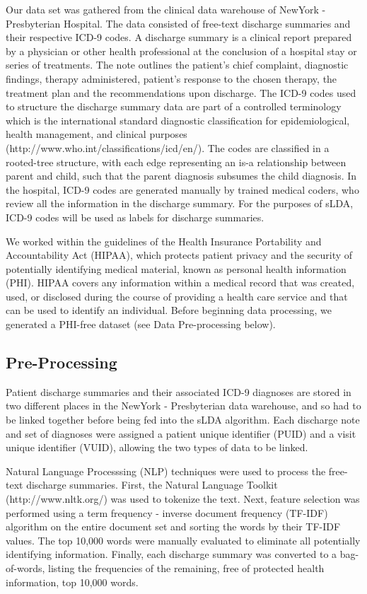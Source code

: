 \documentclass{article}
\begin{document}
Our data set was gathered from the clinical data warehouse of NewYork
- Presbyterian Hospital. The data consisted of free-text discharge
summaries and their respective ICD-9 codes. A discharge summary is
a clinical report prepared by a physician or other health professional
at the conclusion of a hospital stay or series of treatments. The
note outlines the patient\textquoteright{}s chief complaint, diagnostic
findings, therapy administered, patient\textquoteright{}s response
to the chosen therapy, the treatment plan and the recommendations
upon discharge. The ICD-9 codes used to structure the discharge summary
data are part of a controlled terminology which is the international
standard diagnostic classification for epidemiological, health management,
and clinical purposes (http://www.who.int/classifications/icd/en/).
The codes are classified in a rooted-tree structure, with each edge
representing an is-a relationship between parent and child, such that
the parent diagnosis subsumes the child diagnosis. In the hospital,
ICD-9 codes are generated manually by trained medical coders, who
review all the information in the discharge summary. For the purposes
of sLDA, ICD-9 codes will be used as labels for discharge summaries.

We worked within the guidelines of the Health Insurance Portability
and Accountability Act (HIPAA), which protects patient privacy and
the security of potentially identifying medical material, known as
personal health information (PHI). HIPAA covers any information within
a medical record that was created, used, or disclosed during the course
of providing a health care service and that can be used to identify
an individual. Before beginning data processing, we generated a PHI-free
dataset (see Data Pre-processing below).


\subsection{Pre-Processing}

Patient discharge summaries and their associated ICD-9 diagnoses are
stored in two different places in the NewYork - Presbyterian data
warehouse, and so had to be linked together before being fed into
the sLDA algorithm. Each discharge note and set of diagnoses were
assigned a patient unique identifier (PUID) and a visit unique identifier
(VUID), allowing the two types of data to be linked.

Natural Language Processsing (NLP) techniques were used to process
the free-text discharge summaries. First, the Natural Language Toolkit
(http://www.nltk.org/) was used to tokenize the text. Next, feature
selection was performed using a term frequency - inverse document
frequency (TF-IDF) algorithm on the entire document set and sorting
the words by their TF-IDF values. The top 10,000 words were manually
evaluated to eliminate all potentially identifying information. Finally,
each discharge summary was converted to a bag-of-words, listing the
frequencies of the remaining, free of protected health information,
top 10,000 words.
\end{document}
